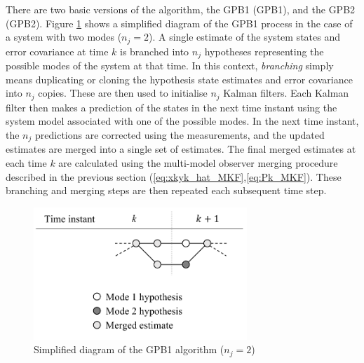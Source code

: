 There are two basic versions of the algorithm, the \acrlong{GPB1} (\acrshort{GPB1}), and the \acrlong{GPB2} (\acrshort{GPB2}). Figure \ref{fig:mm-obs-gpb1} shows a simplified diagram of the \gls{GPB1} process in the case of a system with two modes ($n_j=2$). A single estimate of the system states and error covariance at time $k$ is branched into $n_j$ hypotheses representing the possible modes of the system at that time. In this context, \textit{branching} simply means duplicating or cloning the hypothesis state estimates and error covariance into $n_j$ copies. These are then used to initialise $n_j$ Kalman filters. Each Kalman filter then makes a prediction of the states in the next time instant using the system model associated with one of the possible modes. In the next time instant, the $n_j$ predictions are corrected using the measurements, and the updated estimates are merged into a single set of estimates. The final merged estimates at each time $k$ are calculated using the multi-model observer merging procedure described in the previous section (\ref{eq:xkyk_hat_MKF},\ref{eq:Pk_MKF}). These branching and merging steps are then repeated each subsequent time step.

\begin{figure}[ht]
	\centering
	\includegraphics[height=5cm]{images/mm_obs_seq_gpb1.pdf}
	\caption{Simplified diagram of the \gls{GPB1} algorithm ($n_j=2$)}
	\label{fig:mm-obs-gpb1}
\end{figure}

